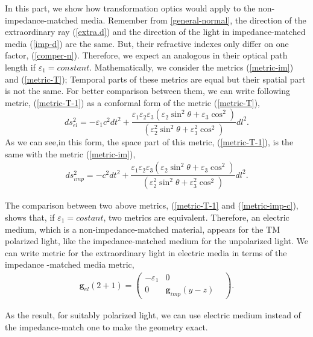 \documentclass[9pt,twocolumn,twoside]{osajnl}
\begin{document}
In this part, we show how transformation optics would apply to the non-impedance-matched media. Remember from \ref{general-normal}, the direction of the extraordinary ray (\ref{extra.d}) and the direction of the light in impedance-matched media (\ref{imp-d}) are the same. But, their refractive indexes only differ on one factor, (\ref{comper-n}). Therefore, we expect an analogous in their optical path length if $\varepsilon_{1}=constant$.  Mathematically, we consider the metrics (\ref{metric-im}) and (\ref{metric-T}); Temporal parts of these metrics are equal but their spatial part is not the same. For better comparison between them, we can write following metric, (\ref{metric-T-1}) as a conformal form of the metric (\ref{metric-T}), 
\begin{equation}\label{metric-T-1}
ds_{el}^{2}=- \varepsilon_{1}c^{2}dt^{2}+\dfrac{\varepsilon_{1}\varepsilon_{2}\varepsilon_{3}\left({\varepsilon_{2} \sin^{2}{\theta} + \varepsilon_{3}\cos^{2}}\right)}{\left({\varepsilon_{2}^{2} \sin^{2}{\theta} + \varepsilon_{3}^{2}\cos^{2}}\right)}dl^{2}.
\end{equation}
As we can see,in this form, the space part of this metric, (\ref{metric-T-1}), is the same with the metric (\ref{metric-im}),
\begin{align}\label{metric-imp-c}
ds_{imp}^{2}=- c^{2}dt^{2}+\dfrac{\varepsilon_{1}\varepsilon_{2}\varepsilon_{3}\left({\varepsilon_{2} \sin^{2}{\theta} + \varepsilon_{3}\cos^{2}}\right)}{\left({\varepsilon_{2}^{2} \sin^{2}{\theta} + \varepsilon_{3}^{2}\cos^{2}}\right)}dl^{2}.
\end{align}

 The comparison between two above metrics, (\ref{metric-T-1} and (\ref{metric-imp-c}),  shows that, if $\varepsilon_1=costant$,  two metrics are equivalent. Therefore, an electric medium, which is a non-impedance-matched material, appears for the TM polarized light, like the impedance-matched medium for the unpolarized light. We can write metric for the extraordinary light in electric media in terms of the impedance -matched media metric,
 \begin{align}
\mathbf{g}_{el}(2+1)=
\begin{pmatrix}
-\varepsilon_{1}&0&\\
0&\mathbf{g}_{imp}(y-z)
\end{pmatrix}.
\end{align}

 As the result, for suitably polarized light, we can use electric medium instead of the impedance-match one to make the geometry exact.
 
\end{document}
